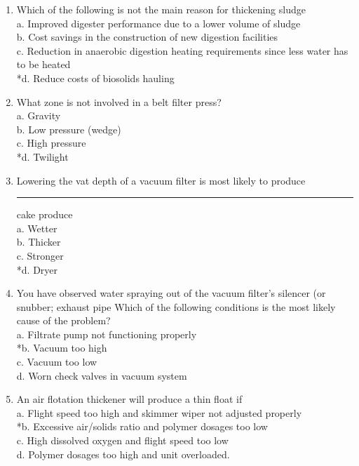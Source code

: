 \documentclass{article}
\begin{document}
\begin{enumerate}
\item  Which of the following is not the main reason for thickening sludge \\

a. Improved digester performance due to a lower volume of sludge \\
b. Cost savings in the construction of new digestion facilities \\
c. Reduction in anaerobic digestion heating requirements since less water has to be heated \\
*d. Reduce costs of biosolids hauling \\

\item  What zone is not involved in a belt filter press? \\

a. Gravity \\
b. Low pressure (wedge) \\
c. High pressure \\
*d. Twilight \\

\item  Lowering the vat depth of a vacuum filter is most likely to produce \rule{1.5cm}{0.3mm} cake produce \\

a. Wetter \\
b. Thicker \\
c. Stronger \\
*d. Dryer \\

\item  You have observed water spraying out of the vacuum filter's silencer (or snubber; exhaust pipe Which of the following conditions is the most likely cause of the problem? \\

a. Filtrate pump not functioning properly \\
*b. Vacuum too high \\
c. Vacuum too low \\
d. Worn check valves in vacuum system \\

\item  An air flotation thickener will produce a thin float if \\

a. Flight speed too high and skimmer wiper not adjusted properly \\
*b. Excessive air/solids ratio and polymer dosages too low \\
c. High dissolved oxygen and flight speed too low \\
d. Polymer dosages too high and unit overloaded. \\


\end{enumerate}
\end{document}
